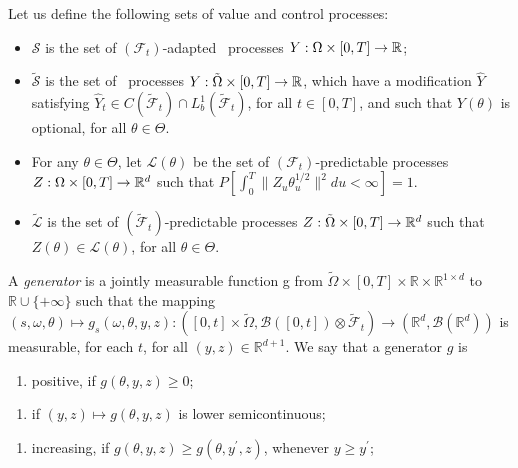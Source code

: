 \documentclass[DIV=classic,a4paper]{artclcomp}
\begin{document}
Let us define the following sets of value and control processes:
\begin{itemize}
	\item $\mathcal{S}$ is the set of $(\mathcal{F}_t)$-adapted \ladlag~processes $Y:\Omega \times [0,T]\to \mathbb{R}$;
	\item $\tilde{\mathcal{S}}$ is the set of \ladlag~processes $Y:\tilde{\Omega}\times [0,T]\to \mathbb{R}$, which have a modification $\hat Y$ satisfying $\hat Y_t \in C(\tilde{\mathcal{F}}_t)\cap L^1_b(\tilde{\mathcal{F}}_t)$, for all $t \in [0,T]$, and such that $Y(\theta)$ is optional, for all $\theta \in\Theta$.
	\item For any $\theta \in \Theta$, let  $\mathcal{L}(\theta)$ be the set of $(\mathcal{F}_t)$-predictable processes $Z:\Omega \times [0,T]\to \mathbb{R}^d$ such that $P\left[\int_{0}^{T}\|Z_u \theta_u^{1/2}\|^2 du<\infty\right]=1$.
	\item $\tilde{\mathcal{L}}$ is the set of $(\tilde{\mathcal{F}}_t)$-predictable processes $Z:\tilde{\Omega}\times [0,T]\to \mathbb{R}^d$ such that $Z(\theta)\in \mathcal{L}(\theta)$, for all $\theta \in \Theta$.
\end{itemize}
A \emph{generator} is a jointly measurable function g from $\tilde \Omega \times [0, T ]\times \mathbb{R}\times \mathbb{R}^{1\times d}$ to $\mathbb{R}\cup  \{+\infty\}$ such that the mapping $(s,\omega, \theta)\mapsto g_s(\omega,\theta,y,z):([0,t]\times \tilde \Omega,\mathcal{B}([0,t])\otimes \tilde{\mathcal{F}}_t)\rightarrow (\mathbb{R}^d,\mathcal{B}(\mathbb{R}^d))$ is measurable, for each $t$, for all $(y,z)\in\mathbb{R}^{d+1}$.
We say that a generator $g$ is
\begin{enumerate}[label=\textsc{(Pos)},leftmargin=40pt]
	\item \label{cond00} positive, if $g\left(\theta, y,z \right)\geq 0$;
\end{enumerate}
\begin{enumerate}[label=\textsc{(Lsc)},leftmargin=40pt]
	\item \label{condlsc} if $(y,z)\mapsto g(\theta,y,z)$ is lower semicontinuous;
\end{enumerate}
\begin{enumerate}[label=\textsc{(Mon)},leftmargin=40pt]
	\item \label{cond03} increasing, if $g\left(\theta,y,z  \right)\geq g\left(\theta, y^\prime ,z\right)$, whenever $y\geq y^\prime$; 
\end{enumerate}
\end{document}
